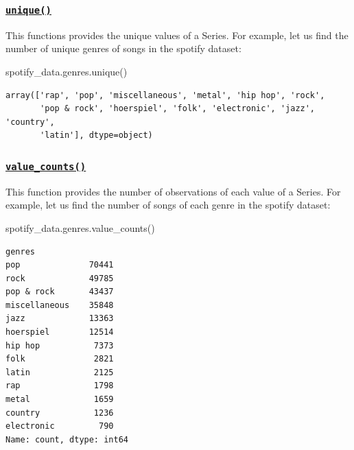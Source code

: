 \documentclass[
  letterpaper,
  DIV=11,
  numbers=noendperiod]{scrreprt}
\newenvironment{Shaded}{\begin{snugshade}}{\end{snugshade}}
\newcommand{\NormalTok}[1]{\textcolor[rgb]{0.00,0.23,0.31}{#1}}
\begin{document}
\hypertarget{unique}{%
\subsubsection{\texorpdfstring{\href{https://pandas.pydata.org/docs/reference/api/pandas.unique.html}{\texttt{unique()}}}{unique()}}\label{unique}}

This functions provides the unique values of a Series. For example, let
us find the number of unique genres of songs in the spotify dataset:

\begin{Shaded}
\begin{Highlighting}[]
\NormalTok{spotify\_data.genres.unique()}
\end{Highlighting}
\end{Shaded}

\begin{verbatim}
array(['rap', 'pop', 'miscellaneous', 'metal', 'hip hop', 'rock',
       'pop & rock', 'hoerspiel', 'folk', 'electronic', 'jazz', 'country',
       'latin'], dtype=object)
\end{verbatim}

\hypertarget{value_counts}{%
\subsubsection{\texorpdfstring{\href{https://pandas.pydata.org/docs/reference/api/pandas.Series.value_counts.html}{\texttt{value\_counts()}}}{value\_counts()}}\label{value_counts}}

This function provides the number of observations of each value of a
Series. For example, let us find the number of songs of each genre in
the spotify dataset:

\begin{Shaded}
\begin{Highlighting}[]
\NormalTok{spotify\_data.genres.value\_counts()}
\end{Highlighting}
\end{Shaded}

\begin{verbatim}
genres
pop              70441
rock             49785
pop & rock       43437
miscellaneous    35848
jazz             13363
hoerspiel        12514
hip hop           7373
folk              2821
latin             2125
rap               1798
metal             1659
country           1236
electronic         790
Name: count, dtype: int64
\end{verbatim}
\end{document}
